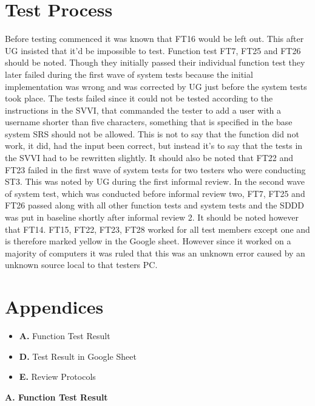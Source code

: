 \documentclass{article}
\begin{document}
\section{Test Process}
Before testing commenced it was known that FT16 would be left out. This after UG insisted that it’d be impossible to test. \newline \newline Function test FT7, FT25 and FT26 should be noted. Though they initially passed their individual function test they later failed during the first wave of system tests because the initial implementation was wrong and was corrected by UG just before the system tests took place. The tests failed since it could not be tested according to the instructions in the SVVI, that commanded the tester to add a user with a username shorter than five characters, something that is specified in the base system SRS should not be allowed. This is not to say that the function did not work, it did, had the input been correct, but instead it’s to say that the tests in the SVVI had to be rewritten slightly. It should also be noted that FT22 and FT23 failed in the first wave of system tests for two testers who were conducting ST3. This was noted by UG during the first informal review. \newline \newline In the second wave of system test, which was conducted before informal review two, FT7, FT25 and FT26 passed along with all other function tests and system tests and the SDDD was put in baseline shortly after informal review 2. It should be noted however that FT14. FT15, FT22, FT23, FT28 worked for all test members except one and is therefore marked yellow in the Google sheet. However since it worked on a majority of computers it was ruled that this was an unknown error caused by an unknown source local to that testers PC.


\section{Appendices}
\begin{itemize}
\item \textbf{A.} Function Test Result
\item \textbf{D.} Test Result in Google Sheet
\item \textbf{E.} Review Protocols
\end{itemize}

\newpage
\begin{flushleft}
{\large\textbf{A. Function Test Result}}
\end{flushleft}
\end{document}
